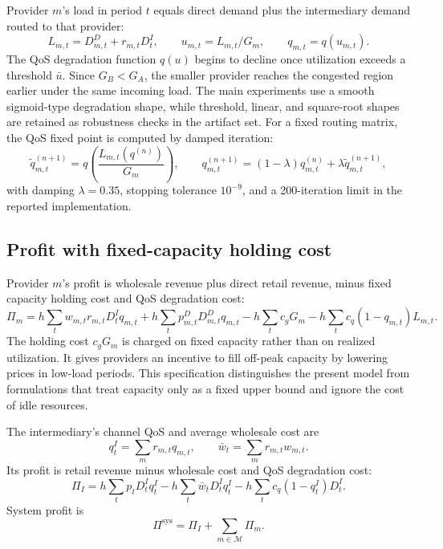 \documentclass[11pt,a4paper]{article}
\newcommand{\qos}{q}
\newcommand{\M}{\mathcal{M}}
\newcommand{\D}{D}
\begin{document}
Provider $m$'s load in period $t$ equals direct demand plus the intermediary demand routed to that provider:
\begin{equation}
  L_{m,t}=\D^D_{m,t}+r_{m,t}\D^I_t,
  \qquad
  u_{m,t}=L_{m,t}/G_m,
  \qquad
  q_{m,t}=\qos(u_{m,t}).
  \label{eq:load}
\end{equation}
The QoS degradation function $\qos(u)$ begins to decline once utilization exceeds a threshold $\bar u$. Since $G_B<G_A$, the smaller provider reaches the congested region earlier under the same incoming load. The main experiments use a smooth sigmoid-type degradation shape, while threshold, linear, and square-root shapes are retained as robustness checks in the artifact set. For a fixed routing matrix, the QoS fixed point is computed by damped iteration:
\begin{equation}
  \tilde q^{(n+1)}_{m,t}
  =\qos\!\left(\frac{L_{m,t}(q^{(n)})}{G_m}\right),
  \qquad
  q^{(n+1)}_{m,t}
  =(1-\lambda)q^{(n)}_{m,t}+\lambda \tilde q^{(n+1)}_{m,t},
  \label{eq:qos_fixed_point}
\end{equation}
with damping $\lambda=0.35$, stopping tolerance $10^{-9}$, and a 200-iteration limit in the reported implementation.

\subsection{Profit with fixed-capacity holding cost}

Provider $m$'s profit is wholesale revenue plus direct retail revenue, minus fixed capacity holding cost and QoS degradation cost:
\begin{equation}
  \Pi_m=h\!\sum_t\! w_{m,t}r_{m,t}\D^I_t q_{m,t}
  +h\!\sum_t\! p^D_{m,t}\D^D_{m,t}q_{m,t}
  -h\!\sum_t\! c_g G_m
  -h\!\sum_t\! c_q(1-q_{m,t})L_{m,t}.
  \label{eq:firm_profit}
\end{equation}
The holding cost $c_gG_m$ is charged on fixed capacity rather than on realized utilization. It gives providers an incentive to fill off-peak capacity by lowering prices in low-load periods. This specification distinguishes the present model from formulations that treat capacity only as a fixed upper bound and ignore the cost of idle resources.

The intermediary's channel QoS and average wholesale cost are
\begin{equation}
  q^I_t=\sum_m r_{m,t}q_{m,t},
  \qquad
  \bar w_t=\sum_m r_{m,t}w_{m,t}.
  \label{eq:intermediary_channel}
\end{equation}
Its profit is retail revenue minus wholesale cost and QoS degradation cost:
\begin{equation}
  \Pi_I
  =h\sum_t p_t\D^I_t q^I_t
  -h\sum_t \bar w_t\D^I_t q^I_t
  -h\sum_t c_q(1-q^I_t)\D^I_t .
  \label{eq:intermediary_profit}
\end{equation}
System profit is
\begin{equation}
  \Pi^{\mathrm{sys}}=\Pi_I+\sum_{m\in\M}\Pi_m .
  \label{eq:system_profit}
\end{equation}
\end{document}
